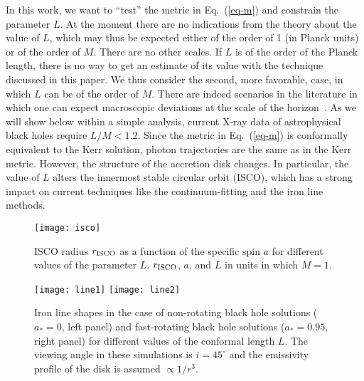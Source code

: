 \documentclass[aps, prd, amsmath, floats, floatfix, twocolumn, nofootinbib, superscriptaddress, showpacs]{revtex4-1}
\begin{document}
In this work, we want to ``test'' the metric in Eq.~(\ref{eq-m}) and constrain the parameter $L$. At the moment there are no indications from the theory about the value of $L$, which may thus be expected either of the order of 1 (in Planck units) or of the order of $M$. There are no other scales. If $L$ is of the order of the Planck length, there is no way to get an estimate of its value with the technique discussed in this paper. We thus consider the second, more favorable, case, in which $L$ can be of the order of $M$. There are indeed scenarios in the literature in which one can expect macroscopic deviations at the scale of the horizon~\cite{q1,q2,q3,q4}. As we will show below within a simple analysis, current X-ray data of astrophysical black holes require $L/M < 1.2$. Since the metric in Eq.~(\ref{eq-m}) is conformally equivalent to the Kerr solution, photon trajectories are the same as in the Kerr metric. However, the structure of the accretion disk changes. In particular, the value of $L$ alters the innermost stable circular orbit (ISCO), which has a strong impact on current techniques like the continuum-fitting and the iron line methods. 





\begin{figure}[t]
\begin{center}
\texttt{[image: isco]}
\end{center}
\vspace{-0.4cm}
\caption{ISCO radius $r_{\rm ISCO}$ as a function of the specific spin $a$ for different values of the parameter $L$. $r_{\rm ISCO}$, $a$, and $L$ in units in which $M=1$. \label{f-isco}}
\end{figure}


\begin{figure*}[t]
\begin{center}
\texttt{[image: line1]}
\texttt{[image: line2]}
\end{center}
\vspace{-0.6cm}
\caption{Iron line shapes in the case of non-rotating black hole solutions ($a_* = 0$, left panel) and fast-rotating black hole solutions ($a_* = 0.95$, right panel) for different values of the conformal length $L$. The viewing angle in these simulations is $i = 45^\circ$ and the emissivity profile of the disk is assumed $\propto 1/r^3$. \label{f-line}}
\end{figure*}
\end{document}
